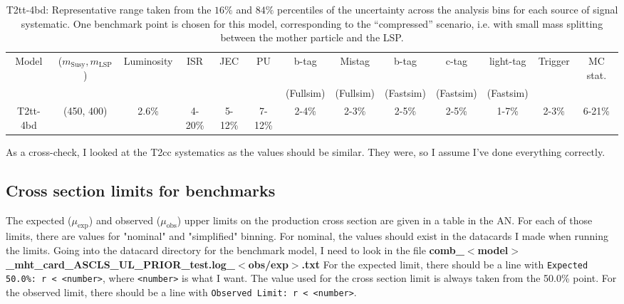 \begin{landscape}
\begin{table}[htbp]
    \centering
    \small
    \begin{tabular}{ ccccccccccccc }
        \hline \hline
        Model & ($m_{\mathrm{Susy}},m_{\mathrm{LSP}}$) & Luminosity & ISR & JEC & PU & b-tag & Mistag & b-tag & c-tag & light-tag & Trigger & MC stat. \\
        & & & & & & (Fullsim) & (Fullsim) & (Fastsim) & (Fastsim) & (Fastsim) & & \\ \hline
        T2tt-4bd & (450, 400) & 2.6\% & 4-20\% & 5-12\% & 7-12\% & 2-4\% & 2-3\% & 2-5\% & 2-5\% & 1-7\% & 2-3\% & 6-21\% \\
        \hline \hline
        \end{tabular}
    \caption{T2tt-4bd: Representative range taken from the $16\%$ and $84\%$ percentiles of the uncertainty across the analysis bins for each source of signal systematic. One benchmark point is chosen for this model, corresponding to the ``compressed'' scenario, i.e. with small mass splitting between the mother particle and the LSP.}
    \label{tab:T2tt-4bdSUS16038systs}
\end{table}
\end{landscape}

As a cross-check, I looked at the T2cc systematics as the values should be similar. They were, so I assume I've done everything correctly.



\subsection{Cross section limits for benchmarks}

The expected ($\mu_{\mathrm{exp}}$) and observed ($\mu_{\mathrm{obs}}$) upper limits on the production cross section are given in a table in the AN. For each of those limits, there are values for "nominal" and "simplified" binning. For nominal, the values should exist in the datacards I made when running the limits. Going into the datacard directory for the benchmark model, I need to look in the file \textbf{comb\_$<$model$>$\_mht\_card\_ASCLS\_UL\_PRIOR\_test.log\_$<$obs/exp$>$.txt} For the expected limit, there should be a line with \texttt{Expected 50.0\%: r < <number>}, where \texttt{<number>} is what I want. The value used for the cross section limit is always taken from the 50.0\% point. For the observed limit, there should be a line with \texttt{Observed Limit: r < <number>}.

